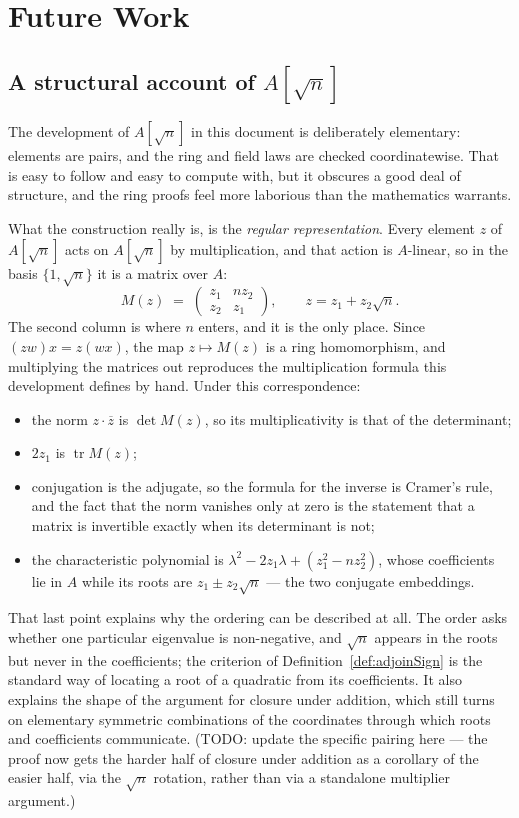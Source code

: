 \chapter{Future Work}

\section{A structural account of $A[\sqrt{n}]$}

The development of $A[\sqrt{n}]$ in this document is deliberately elementary:
elements are pairs, and the ring and field laws are checked coordinatewise. That
is easy to follow and easy to compute with, but it obscures a good deal of
structure, and the ring proofs feel more laborious than the mathematics
warrants.

What the construction really is, is the \emph{regular representation}. Every
element $z$ of $A[\sqrt{n}]$ acts on $A[\sqrt{n}]$ by multiplication, and that
action is $A$-linear, so in the basis $\{1, \sqrt{n}\}$ it is a matrix over $A$:
\begin{displaymath}
  M(z) \;=\;
  \begin{pmatrix} z_1 & n z_2 \\ z_2 & z_1 \end{pmatrix},
  \qquad z = z_1 + z_2\sqrt{n}.
\end{displaymath}
The second column is where $n$ enters, and it is the only place. Since
$(zw)x = z(wx)$, the map $z \mapsto M(z)$ is a ring homomorphism, and
multiplying the matrices out reproduces the multiplication formula this
development defines by hand. Under this correspondence:
\begin{itemize}
\item the norm $z \cdot \overline{z}$ is $\det M(z)$, so its multiplicativity is
      that of the determinant;
\item $2z_1$ is $\operatorname{tr} M(z)$;
\item conjugation is the adjugate, so the formula for the inverse is Cramer's
      rule, and the fact that the norm vanishes only at zero is the statement
      that a matrix is invertible exactly when its determinant is not;
\item the characteristic polynomial is
      $\lambda^2 - 2z_1\lambda + (z_1^2 - n z_2^2)$, whose coefficients lie in
      $A$ while its roots are $z_1 \pm z_2\sqrt{n}$ --- the two conjugate
      embeddings.
\end{itemize}

That last point explains why the ordering can be described at all. The order
asks whether one particular eigenvalue is non-negative, and $\sqrt{n}$ appears
in the roots but never in the coefficients; the criterion of
Definition~\ref{def:adjoinSign} is the standard way of locating a root of a
quadratic from its coefficients. It also explains the shape of the argument for
closure under addition, which still turns on elementary symmetric combinations
of the coordinates through which roots and coefficients communicate. (TODO:
update the specific pairing here --- the proof now gets the harder half of
closure under addition as a corollary of the easier half, via the $\sqrt n$
rotation, rather than via a standalone multiplier argument.)

